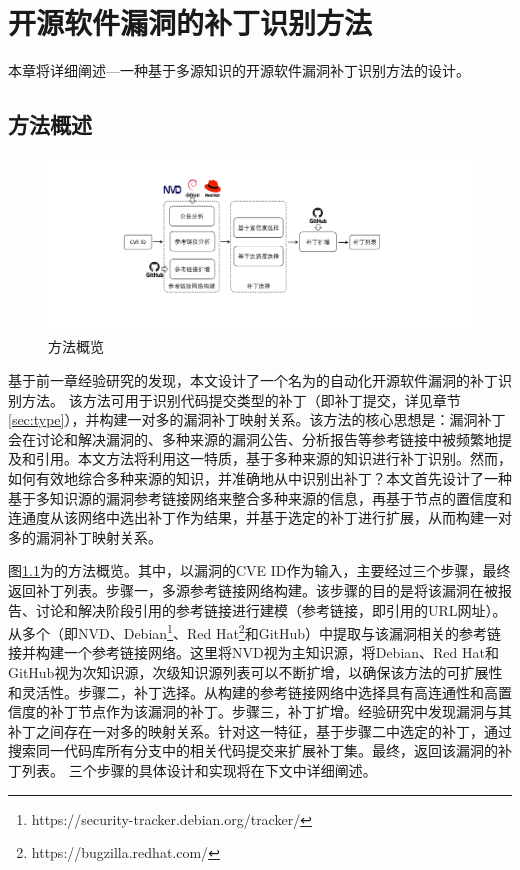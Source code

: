 
\chapter{开源软件漏洞的补丁识别方法}

本章将详细阐述\tool ---一种基于多源知识的开源软件漏洞补丁识别方法的设计。

\section{方法概述}
\begin{figure}[t]
    \centering
    \includegraphics[scale=0.5]{fig/overview.pdf}
    \caption{\tool 方法概览}\label{fig:overview}
\end{figure}

基于前一章经验研究的发现，本文设计了一个名为\tool 的自动化开源软件漏洞的补丁识别方法。
该方法可用于识别代码提交类型的补丁（即补丁提交，详见章节\ref{sec:type}），并构建一对多的漏洞补丁映射关系。该方法的核心思想是：漏洞补丁会在讨论和解决漏洞的、多种来源的漏洞公告、分析报告等参考链接中被频繁地提及和引用。本文方法将利用这一特质，基于多种来源的知识进行补丁识别。然而，如何有效地综合多种来源的知识，并准确地从中识别出补丁？本文首先设计了一种基于多知识源的漏洞参考链接网络来整合多种来源的信息，再基于节点的置信度和连通度从该网络中选出补丁作为结果，并基于选定的补丁进行扩展，从而构建一对多的漏洞补丁映射关系。

图\ref{fig:overview}为\tool 的方法概览。其中，\tool 以漏洞的CVE ID作为输入，主要经过三个步骤，最终返回补丁列表。步骤一，多源参考链接网络构建。该步骤的目的是将该漏洞在被报告、讨论和解决阶段引用的参考链接进行建模（参考链接，即引用的URL网址）。\tool 从多个（即NVD、Debian\footnote{https://security-tracker.debian.org/tracker/}、Red Hat\footnote{https://bugzilla.redhat.com/}和GitHub）中提取与该漏洞相关的参考链接并构建一个参考链接网络。这里将NVD视为主知识源，将Debian、Red Hat和GitHub视为次知识源，次级知识源列表可以不断扩增，以确保该方法的可扩展性和灵活性。步骤二，补丁选择。\tool 从构建的参考链接网络中选择具有高连通性和高置信度的补丁节点作为该漏洞的补丁。步骤三，补丁扩增。经验研究中发现漏洞与其补丁之间存在一对多的映射关系。针对这一特征，基于步骤二中选定的补丁，\tool 通过搜索同一代码库所有分支中的相关代码提交来扩展补丁集。最终，\tool 返回该漏洞的补丁列表。
三个步骤的具体设计和实现将在下文中详细阐述。


